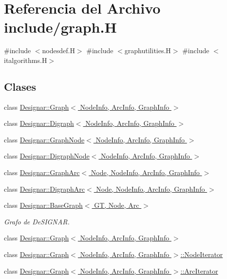 \hypertarget{graph_8_h}{}\section{Referencia del Archivo include/graph.H}
\label{graph_8_h}
{\ttfamily \#include $<$nodesdef.\+H$>$}\newline
{\ttfamily \#include $<$graphutilities.\+H$>$}\newline
{\ttfamily \#include $<$italgorithms.\+H$>$}\newline
\subsection*{Clases}
\begin{DoxyCompactItemize}
\item 
class \hyperlink{class_designar_1_1_graph}{Designar\+::\+Graph$<$ Node\+Info, Arc\+Info, Graph\+Info $>$}
\item 
class \hyperlink{class_designar_1_1_digraph}{Designar\+::\+Digraph$<$ Node\+Info, Arc\+Info, Graph\+Info $>$}
\item 
class \hyperlink{class_designar_1_1_graph_node}{Designar\+::\+Graph\+Node$<$ Node\+Info, Arc\+Info, Graph\+Info $>$}
\item 
class \hyperlink{class_designar_1_1_digraph_node}{Designar\+::\+Digraph\+Node$<$ Node\+Info, Arc\+Info, Graph\+Info $>$}
\item 
class \hyperlink{class_designar_1_1_graph_arc}{Designar\+::\+Graph\+Arc$<$ Node, Node\+Info, Arc\+Info, Graph\+Info $>$}
\item 
class \hyperlink{class_designar_1_1_digraph_arc}{Designar\+::\+Digraph\+Arc$<$ Node, Node\+Info, Arc\+Info, Graph\+Info $>$}
\item 
class \hyperlink{class_designar_1_1_base_graph}{Designar\+::\+Base\+Graph$<$ G\+T, Node, Arc $>$}
\begin{DoxyCompactList}\small\item\em Grafo de De\+S\+I\+G\+N\+AR. \end{DoxyCompactList}\item 
class \hyperlink{class_designar_1_1_graph}{Designar\+::\+Graph$<$ Node\+Info, Arc\+Info, Graph\+Info $>$}
\item 
class \hyperlink{class_designar_1_1_graph_1_1_node_iterator}{Designar\+::\+Graph$<$ Node\+Info, Arc\+Info, Graph\+Info $>$\+::\+Node\+Iterator}
\item 
class \hyperlink{class_designar_1_1_graph_1_1_arc_iterator}{Designar\+::\+Graph$<$ Node\+Info, Arc\+Info, Graph\+Info $>$\+::\+Arc\+Iterator}

\end{DoxyCompactItemize}
